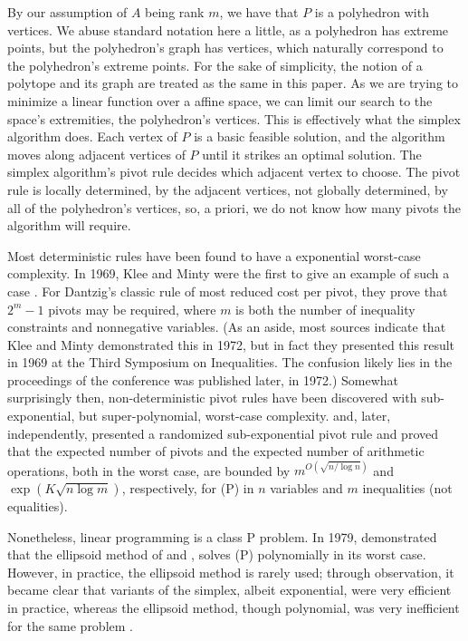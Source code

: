 \documentclass[11pt,a4paper]{article}
\theoremstyle{definition}
\begin{document}
By our assumption of $A$ being rank $m$, we have that $P$ is a polyhedron with vertices. We abuse standard notation here a little, as a polyhedron has extreme points, but the polyhedron's graph has vertices, which naturally correspond to the polyhedron's extreme points. For the sake of simplicity, the notion of a polytope and its graph are treated as the same in this paper. As we are trying to minimize a linear function over a affine space, we can limit our search to the space's extremities, the polyhedron's vertices. This is effectively what the simplex algorithm does. Each vertex of $P$ is a basic feasible solution, and the algorithm moves along adjacent vertices of $P$ until it strikes an optimal solution. The simplex algorithm's pivot rule decides which adjacent vertex to choose. The pivot rule is locally determined, by the adjacent vertices, not globally determined, by all of the polyhedron's vertices, so, a priori, we do not know how many pivots the algorithm will require. 

Most deterministic rules have been found to have a exponential worst-case complexity. In 1969, Klee and Minty were the first to give an example of such a case \citep{klee69}. For Dantzig's classic rule of most reduced cost per pivot, they prove that $2^m-1$ pivots may be required, where $m$ is both the number of inequality constraints and nonnegative variables. (As an aside, most sources indicate that Klee and Minty demonstrated this in 1972, but in fact they presented this result in 1969 at the Third Symposium on Inequalities. The confusion likely lies in the proceedings of the conference was published later, in 1972.) Somewhat surprisingly then, non-deterministic pivot rules have been discovered with sub-exponential, but super-polynomial, worst-case complexity. \citet{kalai92} and, later, independently, \citet{mato96} presented a randomized sub-exponential pivot rule and proved that the expected number of pivots and the expected number of arithmetic operations, both in the worst case, are bounded by $m^{O(\sqrt{n/\log n})}$ and $\exp(K\sqrt{n\log m})$, respectively, for (P) in $n$ variables and $m$ inequalities (not equalities). 

Nonetheless, linear programming is a class P problem. In 1979, \citet{khach79} demonstrated that the ellipsoid method of \citet{shor77} and \citet{judin76}, \citep{judin76b} solves (P) polynomially in its worst case. However, in practice, the ellipsoid method is rarely used; through observation, it became clear that variants of the simplex, albeit exponential, were very efficient in practice, whereas the ellipsoid method, though polynomial, was very inefficient for the same problem \citep{meg87}.
\end{document}
